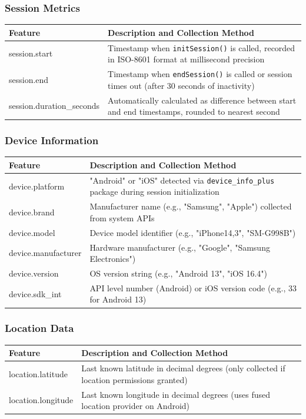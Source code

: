 \documentclass[11pt]{article}
\begin{document}
\subsubsection{Session Metrics}
\begin{longtable}{|p{}|p{}|}
    \hline
    \textbf{Feature} & \textbf{Description and Collection Method} \\
    \hline
    session.start & Timestamp when \texttt{initSession()} is called, recorded in ISO-8601 format at millisecond precision \\
    \hline
    session.end & Timestamp when \texttt{endSession()} is called or session times out (after 30 seconds of inactivity) \\
    \hline
    session.duration\_seconds & Automatically calculated as difference between start and end timestamps, rounded to nearest second \\
    \hline
\end{longtable}

\subsubsection{Device Information}
\begin{longtable}{|p{}|p{}|}
    \hline
    \textbf{Feature} & \textbf{Description and Collection Method} \\
    \hline
    device.platform & "Android" or "iOS" detected via \texttt{device\_info\_plus} package during session initialization \\
    \hline
    device.brand & Manufacturer name (e.g., "Samsung", "Apple") collected from system APIs \\
    \hline
    device.model & Device model identifier (e.g., "iPhone14,3", "SM-G998B") \\
    \hline
    device.manufacturer & Hardware manufacturer (e.g., "Google", "Samsung Electronics") \\
    \hline
    device.version & OS version string (e.g., "Android 13", "iOS 16.4") \\
    \hline
    device.sdk\_int & API level number (Android) or iOS version code (e.g., 33 for Android 13) \\
    \hline
\end{longtable}

\subsubsection{Location Data}
\begin{longtable}{|p{}|p{}|}
    \hline
    \textbf{Feature} & \textbf{Description and Collection Method} \\
    \hline
    location.latitude & Last known latitude in decimal degrees (only collected if location permissions granted) \\
    \hline
    location.longitude & Last known longitude in decimal degrees (uses fused location provider on Android) \\
    \hline
\end{longtable}
\end{document}
